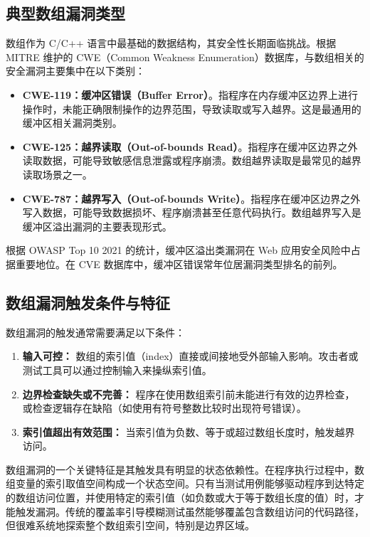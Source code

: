 \documentclass[bachelor]{njupthesis}
\begin{document}
\subsection{典型数组漏洞类型}

数组作为 C/C++ 语言中最基础的数据结构，其安全性长期面临挑战。根据 MITRE 维护的 CWE（Common Weakness Enumeration）数据库，与数组相关的安全漏洞主要集中在以下类别：

\begin{itemize}
    \item \textbf{CWE-119：缓冲区错误（Buffer Error）}\cite{CWE119}。指程序在内存缓冲区边界上进行操作时，未能正确限制操作的边界范围，导致读取或写入越界。这是最通用的缓冲区相关漏洞类别。
    \item \textbf{CWE-125：越界读取（Out-of-bounds Read）}\cite{CWE125}。指程序在缓冲区边界之外读取数据，可能导致敏感信息泄露或程序崩溃。数组越界读取是最常见的越界读取场景之一。
    \item \textbf{CWE-787：越界写入（Out-of-bounds Write）}\cite{CWE787}。指程序在缓冲区边界之外写入数据，可能导致数据损坏、程序崩溃甚至任意代码执行。数组越界写入是缓冲区溢出漏洞的主要表现形式。
\end{itemize}

根据 OWASP Top 10 2021\cite{owasp2021} 的统计，缓冲区溢出类漏洞在 Web 应用安全风险中占据重要地位。在 CVE 数据库中，缓冲区错误常年位居漏洞类型排名的前列\cite{CVEdatabase}。

\subsection{数组漏洞触发条件与特征}

数组漏洞的触发通常需要满足以下条件：

\begin{enumerate}
    \item \textbf{输入可控：} 数组的索引值（index）直接或间接地受外部输入影响。攻击者或测试工具可以通过控制输入来操纵索引值。
    \item \textbf{边界检查缺失或不完善：} 程序在使用数组索引前未能进行有效的边界检查，或检查逻辑存在缺陷（如使用有符号整数比较时出现符号错误）。
    \item \textbf{索引值超出有效范围：} 当索引值为负数、等于或超过数组长度时，触发越界访问。
\end{enumerate}

数组漏洞的一个关键特征是其触发具有明显的状态依赖性。在程序执行过程中，数组变量的索引取值空间构成一个状态空间。只有当测试用例能够驱动程序到达特定的数组访问位置，并使用特定的索引值（如负数或大于等于数组长度的值）时，才能触发漏洞。传统的覆盖率引导模糊测试虽然能够覆盖包含数组访问的代码路径，但很难系统地探索整个数组索引空间，特别是边界区域。
\end{document}
